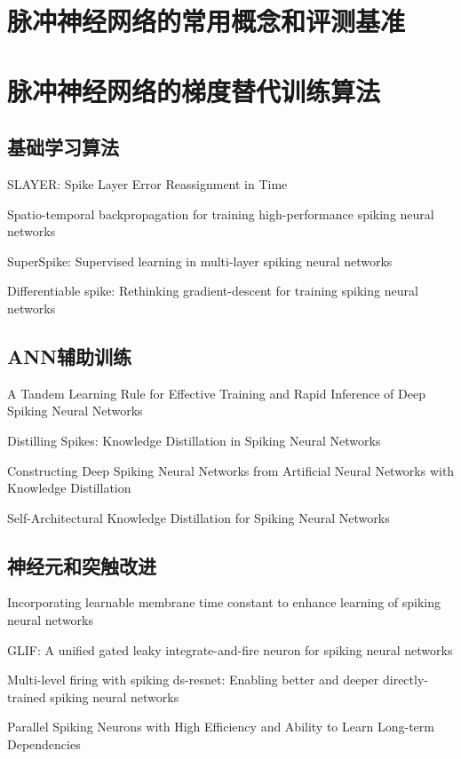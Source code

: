 \documentclass{SCIS2020cn}
\begin{document}
\section{脉冲神经网络的常用概念和评测基准}

\section{脉冲神经网络的梯度替代训练算法}

\subsection{基础学习算法}%

SLAYER: Spike Layer Error Reassignment in Time

Spatio-temporal backpropagation for training high-performance spiking neural networks

SuperSpike: Supervised learning in multi-layer spiking neural networks

Differentiable spike: Rethinking gradient-descent for training spiking neural networks

\subsection{ANN辅助训练}

A Tandem Learning Rule for Effective Training and Rapid Inference of Deep Spiking Neural Networks

Distilling Spikes: Knowledge Distillation in Spiking Neural Networks

Constructing Deep Spiking Neural Networks from Artificial Neural Networks with Knowledge Distillation

Self-Architectural Knowledge Distillation for Spiking Neural Networks


\subsection{神经元和突触改进}%

Incorporating learnable membrane time constant to enhance learning of spiking neural networks

GLIF: A unified gated leaky integrate-and-fire neuron for spiking neural networks

Multi-level firing with spiking ds-resnet: Enabling better and deeper directly-trained spiking neural networks

Parallel Spiking Neurons with High Efficiency and Ability to Learn Long-term Dependencies
\end{document}
